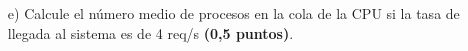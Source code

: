 \documentclass[a4paper,12pt]{article}
\begin{document}
\begin{enumerate}



    













    \item[e)] Calcule el número medio de procesos en la cola de la CPU si la tasa de llegada al sistema es de 4 req/s \textbf{(0,5 puntos)}.



\end{enumerate}
\end{document}
